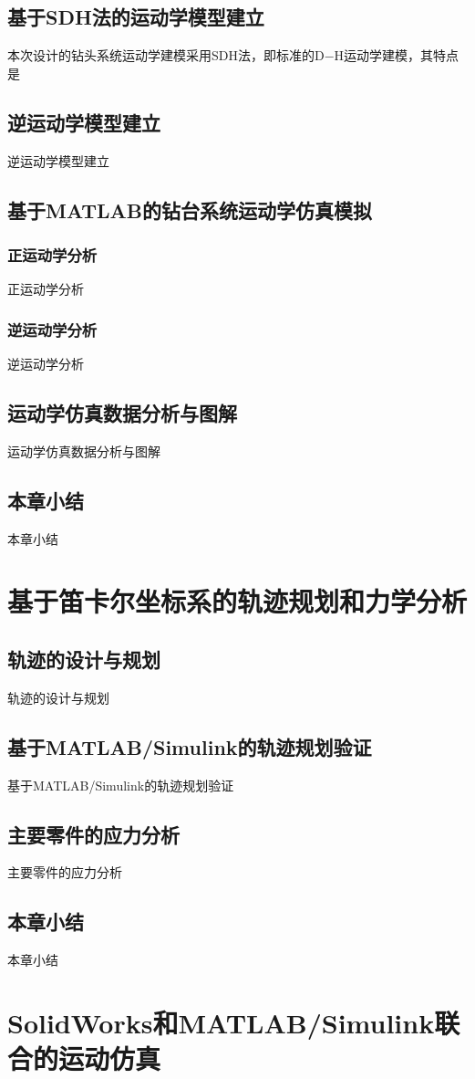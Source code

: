 \documentclass[UTF8]{article}%
\begin{document}
\begin{spacing}{1.5}
	\subsection{基于SDH法的运动学模型建立}
	本次设计的钻头系统运动学建模采用SDH法，即标准的D$-$H运动学建模，其特点是
	\subsection{逆运动学模型建立}
	逆运动学模型建立
	\subsection{基于MATLAB的钻台系统运动学仿真模拟}
		\subsubsection{正运动学分析}
		正运动学分析
		\subsubsection{逆运动学分析}
		逆运动学分析
	\subsection{运动学仿真数据分析与图解}
	运动学仿真数据分析与图解
	\subsection{本章小结}
	本章小结
\section{基于笛卡尔坐标系的轨迹规划和力学分析}
	\subsection{轨迹的设计与规划}
	轨迹的设计与规划
	\subsection{基于MATLAB/Simulink的轨迹规划验证}
	基于MATLAB/Simulink的轨迹规划验证
	\subsection{主要零件的应力分析}
	主要零件的应力分析
	\subsection{本章小结}
	本章小结
\section{SolidWorks和MATLAB/Simulink联合的运动仿真}

\end{spacing}
\end{document}
